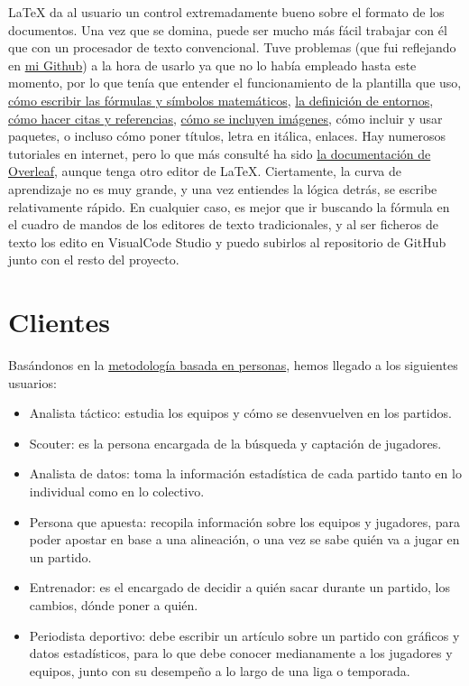 LaTeX da al usuario un control extremadamente bueno sobre el formato de los documentos. Una vez que se 
domina, puede ser mucho más fácil trabajar con él que con un procesador de texto convencional. Tuve 
problemas (que fui reflejando en \href{https://github.com/ElenaMerelo/TFG/issues}{mi Github}) a la hora 
de usarlo ya que no lo había empleado hasta este momento, por lo que tenía que entender 
el funcionamiento de la plantilla que uso, \href{https://github.com/ElenaMerelo/TFG/issues/58}{cómo escribir las fórmulas 
y símbolos matemáticos}, \href{https://github.com/ElenaMerelo/TFG/issues/54}{la definición de entornos}, 
\href{https://github.com/ElenaMerelo/TFG/issues/56}{cómo hacer citas y referencias}, 
\href{https://github.com/ElenaMerelo/TFG/issues/57}{cómo se incluyen imágenes}, cómo incluir y usar paquetes, o incluso cómo poner títulos, letra 
en itálica, enlaces. Hay numerosos tutoriales en internet, pero lo que más consulté ha sido
 \href{https://es.overleaf.com/learn}{la documentación de Overleaf}, aunque tenga otro editor de LaTeX. Ciertamente, 
 la curva de aprendizaje no es muy grande, y una vez entiendes la lógica detrás, se escribe relativamente rápido. En 
 cualquier caso, es mejor que ir buscando la fórmula en el cuadro de mandos de los editores de texto tradicionales, 
 y al ser ficheros de texto los edito en VisualCode Studio y puedo subirlos al repositorio de GitHub junto con el resto 
 del proyecto. 

\section{Clientes}
Basándonos en la \href{https://www.designthinking.services/herramientas-design-thinking/metodo-persona/}{metodología basada en personas}, 
hemos llegado a los siguientes usuarios: 
\begin{itemize}
    \item Analista táctico: estudia los equipos y cómo se desenvuelven en los partidos. 
    \item Scouter: es la persona encargada de la búsqueda y captación 
    de jugadores.
    \item Analista de datos: toma la información estadística de 
    cada partido tanto en lo individual como en lo colectivo. 
    \item Persona que apuesta: recopila información sobre los equipos y jugadores, para poder apostar 
    en base a una alineación, o una vez se sabe quién va a jugar en un partido. 
    \item Entrenador: es el encargado de decidir a quién sacar durante un partido, los 
    cambios, dónde poner a quién.   
    \item Periodista deportivo: debe escribir un artículo sobre un partido con gráficos y datos estadísticos, 
    para lo que debe conocer medianamente a los jugadores y equipos, junto con su desempeño a lo largo de 
    una liga o temporada. 
\end{itemize}

